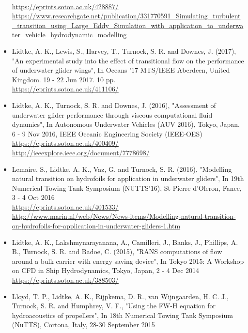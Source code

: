\documentclass[a4paper,10pt]{article}
\begin{document}
\begin{itemize}
	\cite{Lidtke2017a}
	\\ \url{https://eprints.soton.ac.uk/428887/}
	\\ \url{https://www.researchgate.net/publication/331770591\_Simulating\_turbulent\_transition\_using\_Large\_Eddy\_Simulation\_with\_application\_to\_underwater\_vehicle\_hydrodynamic\_modelling}
%
\item Lidtke, A. K., Lewis, S., Harvey, T., Turnock, S. R. and Downes, J. (2017),
	"An experimental study into the effect of transitional flow on the performance
	of underwater glider wings", In Oceans '17 MTS/IEEE Aberdeen, United Kingdom.
	19 - 22 Jun 2017. 10 pp.
	\cite{Lidtke2017b}
	\\ \url{https://eprints.soton.ac.uk/411106/}
%
\item Lidtke, A. K., Turnock, S. R. and Downes, J. (2016), "Assessment of underwater
	glider performance through viscous computational fluid dynamics", In Autonomous
	Underwater Vehicles (AUV 2016), Tokyo, Japan, 6 - 9 Nov 2016, IEEE Oceanic Engineering Society (IEEE-OES)
	\cite{Lidtke2016d}
	\\ \url{https://eprints.soton.ac.uk/400409/}
	\\ \url{http://ieeexplore.ieee.org/document/7778698/}
%
\item Lemaire, S., Lidtke, A. K., Vaz, G. and Turnock, S. R. (2016), "Modelling
	natural transition on hydrofoils for application in underwater gliders",
	In 19th Numerical Towing Tank Symposium (NUTTS'16), St Pierre d'Oleron, Fance, 3 - 4 Oct 2016
	\cite{Lemaire2016}
	\\ \url{https://eprints.soton.ac.uk/401533/}
	\\ \url{http://www.marin.nl/web/News/News-items/Modelling-natural-transition-on-hydrofoils-for-application-in-underwater-gliders-1.htm}
%
\item Lidtke, A. K., Lakshmynarayanana, A., Camilleri, J., Banks, J., Phillips, A. B.,
	Turnock, S. R. and Badoe, C. (2015), "RANS computations of flow around a bulk
	carrier with energy saving device", In Tokyo 2015: A Workshop on CFD in Ship
	Hydrodynamics, Tokyo, Japan, 2 - 4 Dec 2014
	\cite{Lidtke2015b}
	\\ \url{https://eprints.soton.ac.uk/388503/}
%
\item Lloyd, T. P., Lidtke, A. K., Rijpkema, D. R., van Wijngaarden, H. C. J.,
	Turnock, S. R. and Humphrey, V. F., "Using the FW-H equation for hydroacoustics
	of propellers", In 18th Numerical Towing Tank Symposium (NuTTS), Cortona, Italy, 28-30 September 2015
	\cite{Lloyd2015a}

\end{itemize}
\end{document}
